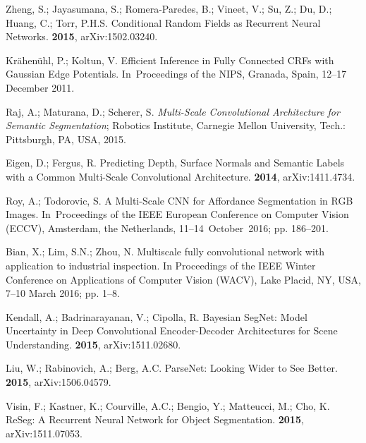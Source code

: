 \documentclass[sensors,article,accept,moreauthors,pdftex]{Definitions/mdpi}
\begin{document}
\begin{thebibliography}{999}
Zheng, S.; Jayasumana, S.; Romera{-}Paredes, B.; Vineet, V.; Su, Z.; Du, D.;
Huang, C.; Torr, P.H.S.
\newblock Conditional Random Fields as Recurrent Neural Networks.
 {\bf 2015}, arXiv:1502.03240.

Kr\"{a}hen\"{u}hl, P.; Koltun, V.
\newblock Efficient Inference in Fully Connected CRFs with Gaussian Edge
Potentials.
\newblock  In~Proceedings of the NIPS, Granada, Spain, 12--17 December 2011. 

Raj, A.; Maturana, D.; Scherer, S.
\newblock \emph{Multi-Scale Convolutional Architecture for Semantic Segmentation};
\newblock  Robotics Institute, Carnegie Mellon University, Tech.:
Pittsburgh, PA, USA, 2015.  

Eigen, D.; Fergus, R.
\newblock Predicting Depth, Surface Normals and Semantic Labels with a Common
Multi-Scale Convolutional Architecture.
 {\bf 2014}, arXiv:1411.4734.

Roy, A.; Todorovic, S.
\newblock A Multi-Scale CNN for Affordance Segmentation in RGB Images.
\newblock In~Proceedings of the IEEE European Conference on Computer
Vision (ECCV), Amsterdam, the Netherlands, \mbox{11--14 October 2016}; pp. 186--201. 

Bian, X.; Lim, S.N.; Zhou, N.
\newblock Multiscale fully convolutional network with application to industrial
inspection.
\newblock In Proceedings of the  IEEE Winter Conference on Applications of Computer Vision
(WACV),  Lake Placid, NY, USA,  7--10 March 2016; pp. 1--8.

Kendall, A.; Badrinarayanan, V.; Cipolla, R.
\newblock Bayesian SegNet: Model Uncertainty in Deep Convolutional
Encoder-Decoder Architectures for Scene Understanding.
 {\bf 2015}, arXiv:1511.02680.

Liu, W.; Rabinovich, A.; Berg, A.C.
\newblock ParseNet: Looking Wider to See Better.
 {\bf 2015}, arXiv:1506.04579.

Visin, F.; Kastner, K.; Courville, A.C.; Bengio, Y.; Matteucci, M.; Cho, K.
\newblock ReSeg: {A} Recurrent Neural Network for Object Segmentation.
 {\bf 2015}, arXiv:1511.07053.


\end{thebibliography}
\end{document}
